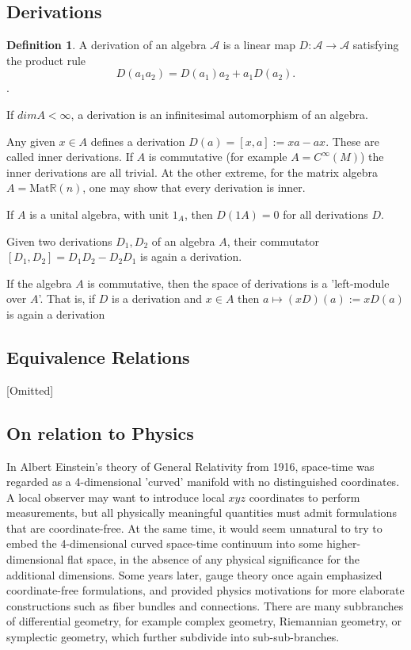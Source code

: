 \documentclass{article}
\theoremstyle{definition}
\newtheorem{defn}[theorem]{Definition}
\newenvironment{definition}
  {\vspace{8pt}\begin{mdframed}[backgroundcolor=blueish,innertopmargin=4]\begin{defn}}
  {\end{defn}\end{mdframed}\vspace{4pt}}
\begin{document}
\subsection{Derivations}
\begin{definition}
A derivation of an algebra $\mathscr A$ is a linear map $D : \mathscr A \rightarrow \mathscr A$ satisfying the product rule 
\[
    D(a_1 a_2) = D(a_1)a_2 +a_1D(a_2).
\].
\end{definition}

If $dim A < \infty$, a derivation is an infinitesimal automorphism of an algebra.

Any given $x \in A$ defines a derivation $D(a) = [x,a] := xa-ax$. These are called inner derivations. If $A$ is commutative (for example $A = C ^\infty(M)$) the inner derivations are all trivial. At the other extreme, for the matrix algebra $A = \text{Mat}\mathbb R(n)$, one may show that every derivation is inner.

If $A$ is a unital algebra, with unit $1_A$, then $D(1A) = 0$ for all derivations $D$.

Given two derivations $D_1,D_2$ of an algebra $A$, their commutator $[D_1,D_2] = D_1 D_2 - D_2 D_1$ is again a derivation.

If the algebra $A$ is commutative, then the space of derivations is a 'left-module over $A$'. That is, if $D$ is a derivation and $x \in A$ then $a \mapsto (xD)(a) := xD(a)$ is again a derivation

\subsection{Equivalence Relations}
[Omitted]

\subsection{On relation to Physics}
In Albert Einstein’s theory of General Relativity from 1916, space-time was regarded as a 4-dimensional 'curved' manifold with no distinguished coordinates. A local observer may want to introduce local $xyz$ coordinates to perform measurements, but all physically meaningful quantities must admit formulations that are coordinate-free. At the same time, it would seem unnatural to try to embed the 4-dimensional curved space-time continuum into some higher-dimensional flat space, in the absence of any physical significance for the additional dimensions. Some years later, gauge theory once again emphasized coordinate-free formulations, and provided physics motivations for more elaborate constructions such as fiber bundles and connections. There are many subbranches of differential geometry, for example complex geometry, Riemannian geometry, or symplectic geometry, which further subdivide into sub-sub-branches.
\end{document}

